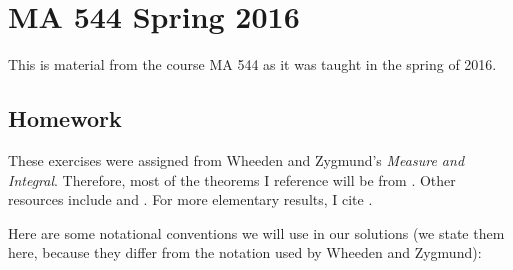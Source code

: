 

\chapter{MA 544 Spring 2016}
\thispagestyle{empty}
This is material from the course MA 544 as it was taught in the spring of
2016.
\bigskip
\section{Homework}
These exercises were assigned from Wheeden and Zygmund's \emph{Measure and
  Integral}. Therefore, most of the theorems I reference will be from
\cite{wheeden-zygmund}. Other resources include \cite{folland} and
\cite{royden}. For more elementary results, I cite \cite{rudin-1}.

Here are some notational conventions we will use in our solutions (we state
them here, because they differ from the notation used by Wheeden and
Zygmund):

\bigskip

